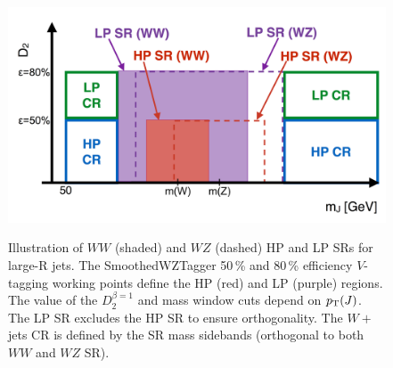 \begin{figure}[t]
\centering
\caption[Illustration of high purity and low purity signal region for large-R jets]{Illustration of $WW$ (shaded) and $WZ$ (dashed) HP and LP SRs for large-R jets. The SmoothedWZTagger 50\,\% and 80\,\% efficiency $V$-tagging working points define the HP (red) and LP (purple) regions. The value of the $D_2^{\beta=1}$ and mass window cuts depend on $p_{\text{T}}(J)$. The LP SR excludes the HP SR to ensure orthogonality. The $W+$jets CR is defined by the SR mass sidebands (orthogonal to both $WW$ and $WZ$ SR).}
\includegraphics[width=.75\textwidth]{figures/EventSelection/HPLPdefinition}
\label{fig:hplp_def}
\end{figure}

